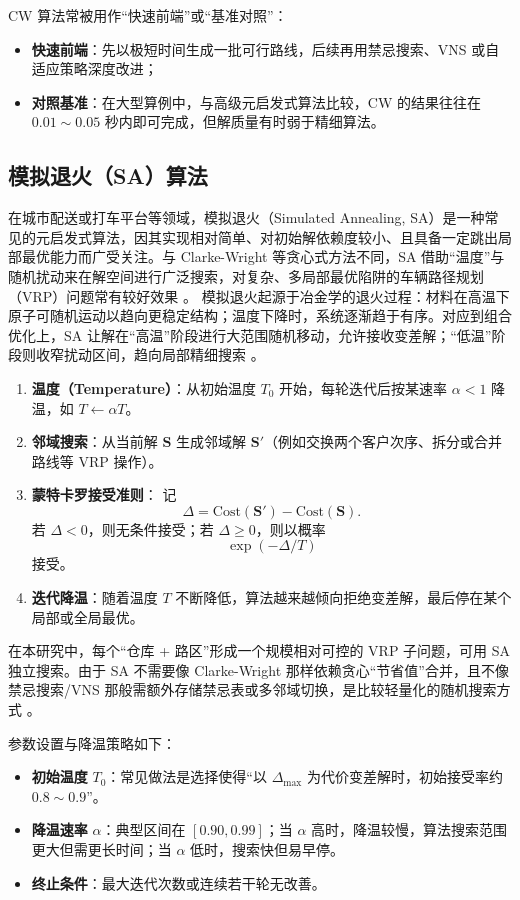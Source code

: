 \documentclass[12pt,a4paper,twoside]{ctexbook}
\begin{document}
CW 算法常被用作“快速前端”或“基准对照”：
\begin{itemize}
    \item \textbf{快速前端}：先以极短时间生成一批可行路线，后续再用禁忌搜索、VNS 或自适应策略深度改进；
    \item \textbf{对照基准}：在大型算例中，与高级元启发式算法比较，CW 的结果往往在 $0.01 \sim 0.05$ 秒内即可完成，但解质量有时弱于精细算法。
\end{itemize}

\subsection{模拟退火（SA）算法}

在城市配送或打车平台等领域，模拟退火（Simulated Annealing, SA）是一种常见的元启发式算法，因其实现相对简单、对初始解依赖度较小、且具备一定跳出局部最优能力而广受关注。与 Clarke-Wright 等贪心式方法不同，SA 借助“温度”与随机扰动来在解空间进行广泛搜索，对复杂、多局部最优陷阱的车辆路径规划（VRP）问题常有较好效果 \cite{vidal2013hybrid}。
模拟退火起源于冶金学的退火过程：材料在高温下原子可随机运动以趋向更稳定结构；温度下降时，系统逐渐趋于有序。对应到组合优化上，SA 让解在“高温”阶段进行大范围随机移动，允许接收变差解；“低温”阶段则收窄扰动区间，趋向局部精细搜索 \cite{golden2008vehicle}。

\begin{enumerate}
    \item \textbf{温度（Temperature）}：从初始温度 $T_0$ 开始，每轮迭代后按某速率 $\alpha < 1$ 降温，如 $T \leftarrow \alpha T$。
    \item \textbf{邻域搜索}：从当前解 $\mathbf{S}$ 生成邻域解 $\mathbf{S}'$（例如交换两个客户次序、拆分或合并路线等 VRP 操作）。
    \item \textbf{蒙特卡罗接受准则}：
    记
    \[
    \Delta = \text{Cost}(\mathbf{S}') - \text{Cost}(\mathbf{S}).
    \]
    若 $\Delta < 0$，则无条件接受；若 $\Delta \geq 0$，则以概率
    \[
    \exp(-\Delta / T)
    \]
    接受。
    \item \textbf{迭代降温}：随着温度 $T$ 不断降低，算法越来越倾向拒绝变差解，最后停在某个局部或全局最优。
\end{enumerate}

在本研究中，每个“仓库 + 路区”形成一个规模相对可控的 VRP 子问题，可用 SA 独立搜索。由于 SA 不需要像 Clarke-Wright 那样依赖贪心“节省值”合并，且不像禁忌搜索/VNS 那般需额外存储禁忌表或多邻域切换，是比较轻量化的随机搜索方式 \cite{vidal2013hybrid}。

参数设置与降温策略如下：
\begin{itemize}
    \item \textbf{初始温度} $T_0$：常见做法是选择使得“以 $\Delta_{\max}$ 为代价变差解时，初始接受率约 $0.8 \sim 0.9$”。
    \item \textbf{降温速率} $\alpha$：典型区间在 $[0.90, 0.99]$；当 $\alpha$ 高时，降温较慢，算法搜索范围更大但需更长时间；当 $\alpha$ 低时，搜索快但易早停。
    \item \textbf{终止条件}：最大迭代次数或连续若干轮无改善。
\end{itemize}
\end{document}
